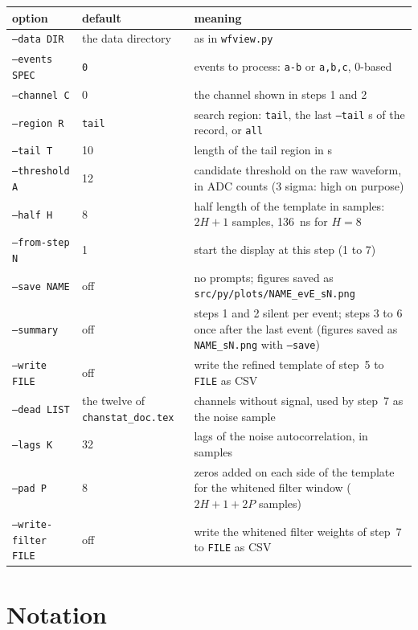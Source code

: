 \documentclass[11pt]{article}
\newcommand{\code}[1]{\texttt{#1}}
\newcommand{\us}{\textmu s}
\begin{document}
\begin{center}
\begin{tabular}{l l p{74mm}}
\toprule
option & default & meaning \\
\midrule
\code{--data DIR} & the data directory & as in \code{wfview.py} \\
\code{--events SPEC} & \code{0} & events to process: \code{a-b} or \code{a,b,c}, 0-based \\
\code{--channel C} & 0 & the channel shown in steps 1 and 2 \\
\code{--region R} & \code{tail} & search region: \code{tail}, the last \code{--tail} \us{} of the record, or \code{all} \\
\code{--tail T} & 10 & length of the tail region in \us \\
\code{--threshold A} & 12 & candidate threshold on the raw waveform, in ADC counts (3 sigma: high on purpose) \\
\code{--half H} & 8 & half length of the template in samples: $2H + 1$ samples, 136~ns for $H = 8$ \\
\code{--from-step N} & 1 & start the display at this step (1 to 7) \\
\code{--save NAME} & off & no prompts; figures saved as \code{src/py/plots/NAME\_evE\_sN.png} \\
\code{--summary} & off & steps 1 and 2 silent per event; steps 3 to 6 once after the last event (figures saved as \code{NAME\_sN.png} with \code{--save}) \\
\code{--write FILE} & off & write the refined template of step~5 to \code{FILE} as CSV \\
\code{--dead LIST} & the twelve of \code{chanstat\_doc.tex} & channels without signal, used by step~7 as the noise sample \\
\code{--lags K} & 32 & lags of the noise autocorrelation, in samples \\
\code{--pad P} & 8 & zeros added on each side of the template for the whitened filter window ($2H + 1 + 2P$ samples) \\
\code{--write-filter FILE} & off & write the whitened filter weights of step~7 to \code{FILE} as CSV \\
\bottomrule
\end{tabular}
\end{center}

\section{Notation}
\end{document}
